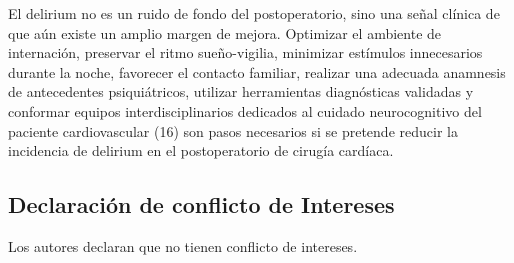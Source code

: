 \documentclass{article}
\begin{document}
El delirium no es un ruido de fondo del postoperatorio, sino una señal clínica de que aún existe un amplio margen de mejora. Optimizar el ambiente de internación, preservar el ritmo sueño-vigilia, minimizar estímulos innecesarios durante la noche, favorecer el contacto familiar, realizar una adecuada anamnesis de antecedentes psiquiátricos, utilizar herramientas diagnósticas validadas y conformar equipos interdisciplinarios dedicados al cuidado neurocognitivo del paciente cardiovascular (16) son pasos necesarios si se pretende reducir la incidencia de delirium en el postoperatorio de cirugía cardíaca.

\subsection{Declaración de conflicto de Intereses}
Los autores declaran que no tienen conflicto de intereses.




\printbibliography
\end{document}
